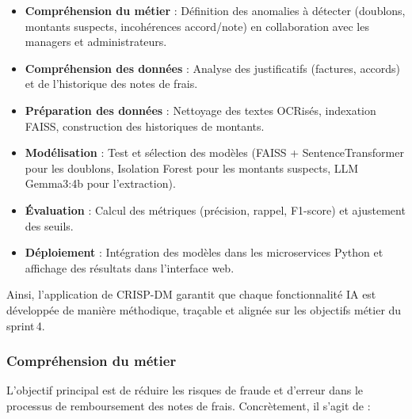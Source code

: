 \documentclass[12pt,a4paper]{report}
\begin{document}
\begin{itemize}
 \item \textbf{Compréhension du métier} : Définition des anomalies à détecter (doublons, montants suspects, incohérences accord/note) en collaboration avec les managers et administrateurs.
 
 \item \textbf{Compréhension des données} : Analyse des justificatifs (factures, accords) et de l'historique des notes de frais.
 
 \item \textbf{Préparation des données} : Nettoyage des textes OCRisés, indexation FAISS, construction des historiques de montants.
 
 \item \textbf{Modélisation} : Test et sélection des modèles (FAISS + SentenceTransformer pour les doublons, Isolation Forest pour les montants suspects, LLM Gemma3:4b pour l'extraction).
 
 \item \textbf{Évaluation} : Calcul des métriques (précision, rappel, F1-score) et ajustement des seuils.
 
 \item \textbf{Déploiement} : Intégration des modèles dans les microservices Python et affichage des résultats dans l'interface web.
\end{itemize}

Ainsi, l’application de CRISP-DM garantit que chaque fonctionnalité IA est développée de manière méthodique, traçable et alignée sur les objectifs métier du sprint 4.





\subsubsection{Compréhension du métier}

L'objectif principal est de réduire les risques de fraude et d'erreur dans le processus de remboursement des notes de frais. Concrètement, il s'agit de :
\end{document}
